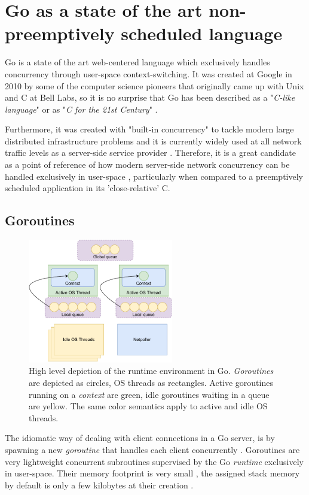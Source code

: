\section{Go as a state of the art non-preemptively scheduled language}
Go is a state of the art web-centered language which exclusively handles concurrency through user-space context-switching. It was created at Google in 2010 by some of the computer science pioneers that originally came up with Unix and C at Bell Labs, so it is no surprise that Go has been described as a "\textit{C-like language}" or as "\textit{C for the 21st Century}" \cite{GoPL2015}. 

Furthermore, it was created with "built-in concurrency" to tackle modern large distributed infrastructure problems and it is currently widely used at all network traffic levels as a server-side service provider \cite{Pike2012}\cite{Ajmani2016}\cite{2022DataRacesGolang}. Therefore, it is a great candidate as a point of reference of how modern server-side network concurrency can be handled exclusively in user-space \cite{GoArticleACM}, particularly when compared to a preemptively scheduled application in its 'close-relative' C.

\subsection{Goroutines}
\begin{figure}[!t]
	\centering
	\includegraphics[width=2.5in]{img/go_runtime.pdf}
	\caption{High level depiction of the runtime environment in Go. \textit{Goroutines} are depicted as circles, OS threads as rectangles. Active goroutines running on a \textit{context} are green, idle goroutines waiting in a queue are yellow. The same color semantics apply to active and idle OS threads.}
	\label{fig_go_runtime}
\end{figure}
The idiomatic way of dealing with client connections in a Go server, is by spawning a new \textit{goroutine} that handles each client concurrently \cite{Morsing2013_2}\cite{GoNet}. Goroutines are very lightweight concurrent subroutines supervised by the Go \textit{runtime} exclusively in user-space. Their memory footprint is very small \cite{2013ContextSwitching}, the assigned stack memory by default is only a few kilobytes at their creation \cite{Cox-Buday2017}. 

